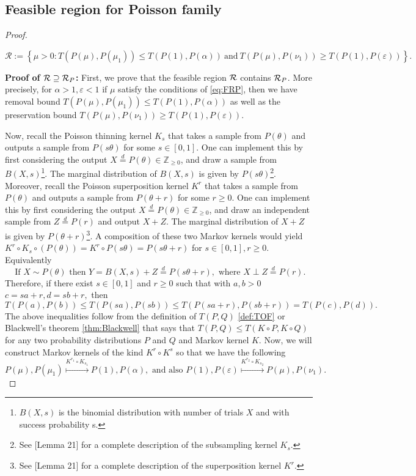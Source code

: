 \subsection{Feasible region for Poisson family}
\FRP*
\begin{proof} \label{proof:FRP}

$\mathcal R
:=
\left\{
\mu>0:
T(P(\mu),P(\mu_1))\le T(P(1),P(\alpha))
\ \text{and}\
T(P(\mu),P(\nu_1))\ge T(P(1),P(\varepsilon))
\right\}.$

\textbf{Proof of $\mathcal{R} \supseteq\mathcal{R}_P$:} First, we prove that the feasible region $\mathcal{R}$ contains $\mathcal{R}_P$. More precisely, for $\alpha > 1, \varepsilon< 1$ if $\mu$ satisfy the conditions of \ref{eq:FRP}, then we have removal bound $T(P(\mu), P(\mu_1)) \leq T(P(1), P(\alpha))$ as well as the preservation bound $T(P(\mu), P(\nu_1)) \geq T(P(1),P(\varepsilon))$.  

Now, recall the Poisson thinning kernel $K_s$ that takes a sample from $P(\theta)$ and outputs a sample from $P(s\theta)$ for some $s\in [0,1]$. One can implement this by first considering the output  $X\overset{d}{=} P(\theta)\in \mathbb{Z}_{\geq 0}$, and draw  a sample from  $B(X,s)$\footnote{$B(X,s)$ is the binomial distribution with number of trials $X$ and with success probability  s.}. The marginal distribution of  $B(X,s)$ is given by $P(s\theta)$\footnote{See \citet{pandey2025infinitely}[Lemma 21] for a complete description of the subsampling kernel $K_s$.}. Moreover, recall the Poisson superposition kernel $K^{r}$ that takes a sample from $P(\theta)$ and outputs a sample from $P(\theta +r)$ for some $r\geq 0$. One can implement this by first considering the output  $X\overset{d}{=} P(\theta)\in \mathbb{Z}_{\geq 0}$, and draw  an independent  sample from  $Z \overset{d}{=}P(r)$ and output  $X+Z$. The marginal distribution of  $X+Z$ is given by $P(\theta +r)$\footnote{See \citet{pandey2025infinitely}[Lemma 21] for a complete description of the superposition kernel $K^r$.}.  A composition of these two Markov kernels would yield $K^r \circ K_s \circ (P(\theta)) =K^r \circ P(s\theta)= P(s\theta +r)$ for $s\in [0,1], r\geq 0$. Equivalently
\[
\text{ If }
X\sim P(\theta)
\text{ then }
Y= B(X,s) + Z
\overset{d}{=}
P(s\theta+r), 
\text{ where }
X \perp Z \overset{d}{=} P(r).
\]
Therefore, if there exist \(s\in[0,1]\) and \(r\ge0\) such that with $a, b>0$ $c=s a+r, d=s b+r,$
then
\[
T(P(a),P(b))\le T(P(sa), P(sb)) \leq T(P(sa+r), P(sb+r)) = T(P(c),P(d)).
\]
The above inequalities follow from the definition of $T(P,Q)$ \ref{def:TOF} or Blackwell's theorem \ref{thm:Blackwell} that says that $T(P,Q) \leq T(K\circ P, K \circ Q)$ for any two 
probability distributions $P$ and $Q$ and Markov kernel $K$.
Now, we will construct Markov kernels of the kind $K^r\circ K^s$ so that we have the following
\[
P(\mu),P(\mu_1)
\overset{K^{r_1}\circ K_{s_1}}{\longmapsto}
P(1),P(\alpha), \text{ and also }
P(1),P(\varepsilon)
\overset{K^{r_2}\circ K_{s_2}}{\longmapsto}
P(\mu),P(\nu_1).
\]





\end{proof}
